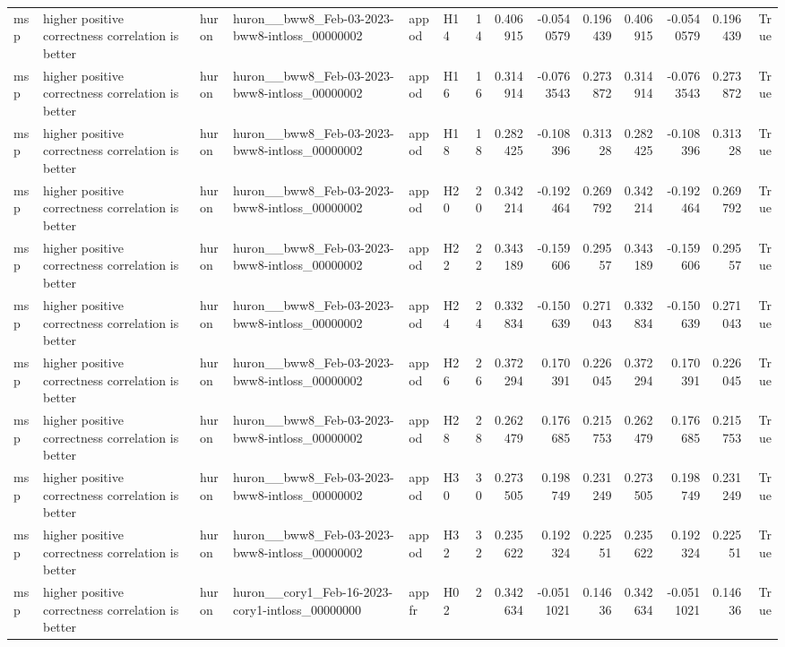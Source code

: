 \begin{longtable}{llllllrrrrrrrr}
msp & higher positive correctness correlation is better & huron & huron\_\_bww8\_Feb-03-2023-bww8-intloss\_00000002 & appod & H14 & 14 & 0.406915 & -0.0540579 & 0.196439 & 0.406915 & -0.0540579 & 0.196439 & True \\
msp & higher positive correctness correlation is better & huron & huron\_\_bww8\_Feb-03-2023-bww8-intloss\_00000002 & appod & H16 & 16 & 0.314914 & -0.0763543 & 0.273872 & 0.314914 & -0.0763543 & 0.273872 & True \\
msp & higher positive correctness correlation is better & huron & huron\_\_bww8\_Feb-03-2023-bww8-intloss\_00000002 & appod & H18 & 18 & 0.282425 & -0.108396 & 0.31328 & 0.282425 & -0.108396 & 0.31328 & True \\
msp & higher positive correctness correlation is better & huron & huron\_\_bww8\_Feb-03-2023-bww8-intloss\_00000002 & appod & H20 & 20 & 0.342214 & -0.192464 & 0.269792 & 0.342214 & -0.192464 & 0.269792 & True \\
msp & higher positive correctness correlation is better & huron & huron\_\_bww8\_Feb-03-2023-bww8-intloss\_00000002 & appod & H22 & 22 & 0.343189 & -0.159606 & 0.29557 & 0.343189 & -0.159606 & 0.29557 & True \\
msp & higher positive correctness correlation is better & huron & huron\_\_bww8\_Feb-03-2023-bww8-intloss\_00000002 & appod & H24 & 24 & 0.332834 & -0.150639 & 0.271043 & 0.332834 & -0.150639 & 0.271043 & True \\
msp & higher positive correctness correlation is better & huron & huron\_\_bww8\_Feb-03-2023-bww8-intloss\_00000002 & appod & H26 & 26 & 0.372294 & 0.170391 & 0.226045 & 0.372294 & 0.170391 & 0.226045 & True \\
msp & higher positive correctness correlation is better & huron & huron\_\_bww8\_Feb-03-2023-bww8-intloss\_00000002 & appod & H28 & 28 & 0.262479 & 0.176685 & 0.215753 & 0.262479 & 0.176685 & 0.215753 & True \\
msp & higher positive correctness correlation is better & huron & huron\_\_bww8\_Feb-03-2023-bww8-intloss\_00000002 & appod & H30 & 30 & 0.273505 & 0.198749 & 0.231249 & 0.273505 & 0.198749 & 0.231249 & True \\
msp & higher positive correctness correlation is better & huron & huron\_\_bww8\_Feb-03-2023-bww8-intloss\_00000002 & appod & H32 & 32 & 0.235622 & 0.192324 & 0.22551 & 0.235622 & 0.192324 & 0.22551 & True \\
msp & higher positive correctness correlation is better & huron & huron\_\_cory1\_Feb-16-2023-cory1-intloss\_00000000 & appfr & H02 & 2 & 0.342634 & -0.0511021 & 0.14636 & 0.342634 & -0.0511021 & 0.14636 & True \\

\end{longtable}
